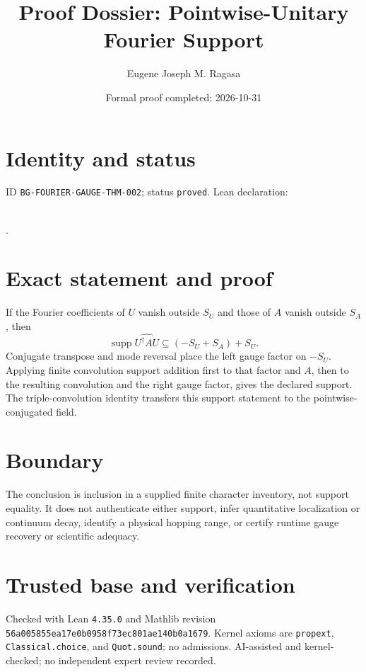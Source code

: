 \documentclass[11pt]{article}
\title{Proof Dossier: Pointwise-Unitary Fourier Support}\author{Eugene Joseph M. Ragasa}\date{Formal proof completed: 2026-10-31}
\begin{document}
\maketitle
\section{Identity and status}
ID \texttt{BG-FOURIER-GAUGE-THM-002}; status \texttt{proved}. Lean declaration:
\par{}\\
{\tiny{}}.
\section{Exact statement and proof}
If the Fourier coefficients of $U$ vanish outside $S_U$ and those of $A$ vanish outside $S_A$,
then
\[
 \operatorname{supp}\widehat{U^\dagger A U}
 \subseteq (-S_U+S_A)+S_U.
\]
Conjugate transpose and mode reversal place the left gauge factor on $-S_U$. Applying finite
convolution support addition first to that factor and $A$, then to the resulting convolution and the
right gauge factor, gives the declared support. The triple-convolution identity transfers this
support statement to the pointwise-conjugated field.
\section{Boundary}
The conclusion is inclusion in a supplied finite character inventory, not support equality. It does
not authenticate either support, infer quantitative localization or continuum decay, identify a
physical hopping range, or certify runtime gauge recovery or scientific adequacy.
\section{Trusted base and verification}
Checked with Lean \texttt{4.35.0} and Mathlib revision
\texttt{56a005855ea17e0b0958f73ec801ae140b0a1679}. Kernel axioms are
\texttt{propext}, \texttt{Classical.choice}, and \texttt{Quot.sound}; no admissions.
AI-assisted and kernel-checked; no independent expert review recorded.
\end{document}
